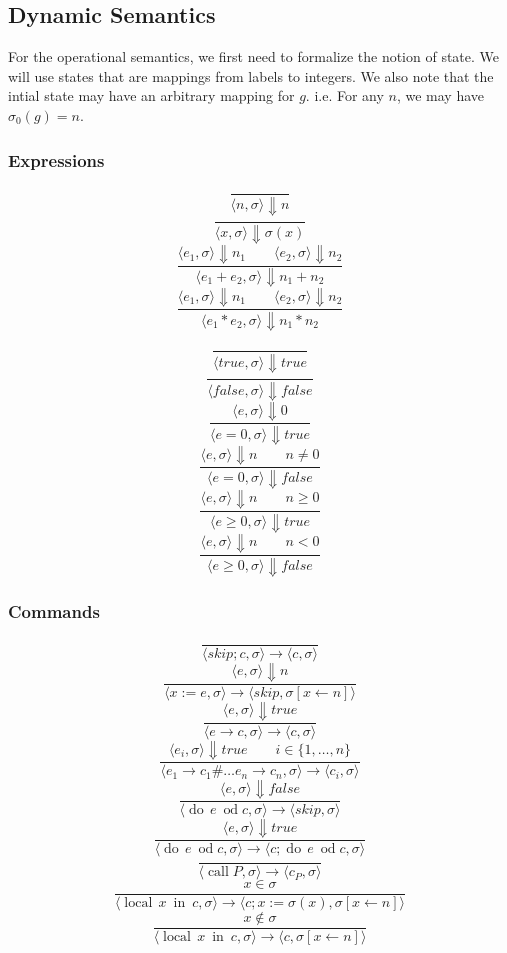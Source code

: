 \documentclass{article}
\newcommand{\dood}[1]{\operatorname{do}\, #1\ \operatorname{od}}
\newcommand{\callP}{\operatorname{call} P}
\newcommand{\localin}[2]{\operatorname{local}\, #1\ \operatorname{in}\ #2}
\begin{document}
\subsection{Dynamic Semantics}
\newcommand{\bigstep}[3]{\langle #1, #2 \rangle \Downarrow #3}
\newcommand{\smallstep}[4]{\langle #1, #2 \rangle \rightarrow \langle #3, #4 \rangle}

    For the operational semantics, we first need to formalize the notion of
    state.  We will use states that are mappings from labels to integers. We also note that the intial state may have an arbitrary mapping for $g$.  i.e. For any $n$, we may have $\sigma_0(g) = n$.
\subsubsection*{Expressions}
\[\frac{}
{\bigstep{n}{\sigma}{ n}}
\]
\[\frac{}
{\bigstep{x}{\sigma}{\sigma(x)}}
\]
\[\frac{\bigstep{e_1}{\sigma}{n_1} \qquad \bigstep{e_2}{\sigma}{n_2}}
{\bigstep{e_1 + e_2}{\sigma}{n_1 + n_2}}
\]
\[\frac{\bigstep{e_1}{\sigma}{n_1} \qquad \bigstep{e_2}{\sigma}{n_2}}
{\bigstep{e_1 * e_2}{\sigma}{n_1 * n_2}}
\]

\[\frac{}
{\bigstep{true}{\sigma}{true}}
\]
\[\frac{}
{\bigstep{false}{\sigma}{false}}
\]
\[\frac{\bigstep{e}{\sigma}{0}}
{\bigstep{e = 0}{\sigma}{ true }}
\]
\[\frac{\bigstep{e}{\sigma}{n} \qquad n \ne 0}
{\bigstep{e = 0}{\sigma}{false}}
\]
\[\frac{\bigstep{e}{\sigma}{n} \qquad n \ge 0}
{\bigstep{e \ge 0}{\sigma}{true}}
\]
\[\frac{\bigstep{e}{\sigma}{n} \qquad n < 0}
{\bigstep{e \ge 0}{\sigma}{false}}
\]


\subsubsection*{Commands}
\[\frac{}
{\smallstep{skip;c}{\sigma}{c}{\sigma}}
\]
\[\frac{\bigstep{e}{\sigma}{n}}
{\smallstep{x := e}{\sigma}{skip}{\sigma[x \gets n]}}
\]
\[\frac{\bigstep{e}{\sigma}{true}}
{\smallstep{e \rightarrow c}{\sigma}{c}{\sigma}}
\]
\[\frac{\bigstep{e_i}{\sigma}{true} \qquad i \in \{1,\dots,n\}}
{\smallstep{e_1 \rightarrow c_1 \# \dots e_n \rightarrow c_n}{\sigma}{c_i}{\sigma}}
\]
\[\frac{\bigstep{e}{\sigma}{false}}
{\smallstep{\dood{e}{c}}{\sigma}{skip}{\sigma}}
\]
\[\frac{\bigstep{e}{\sigma}{true}}
{\smallstep{\dood{e}{c}}{\sigma}{c;\dood{e}{c}}{\sigma}}
\]
\[\frac{}
{\smallstep{\callP}{\sigma}{c_P}{\sigma}}
\]
\[\frac{x \in \sigma}
{\smallstep{\localin{x}{c}}{\sigma}{c; x := \sigma(x) }{\sigma[x \gets n]}}
\]
\[\frac{x \not\in \sigma}
{\smallstep{\localin{x}{c}}{\sigma}{c}{\sigma[x \gets n]}}
\]
\end{document}

